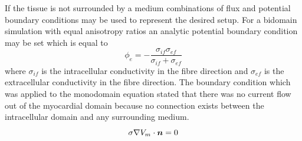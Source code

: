 If the tissue is not
surrounded by a medium combinations of flux and potential boundary conditions
may be used to represent the desired setup. For a bidomain simulation with
equal anisotropy ratios an analytic potential boundary condition \citet{henriquez:1993}
may be set which is equal to
\begin{equation}
  \phi_e=-\dfrac{\sigma_{if}\sigma_{ef}}{\sigma_{if}+\sigma_{ef}}
\end{equation}
where $\sigma_{if}$ is the intracellular conductivity in the fibre direction
and $\sigma_{ef}$ is the extracellular conductivity in the fibre direction.
The boundary condition which was applied to the monodomain equation stated
that there was no current flow out of the myocardial domain because no
connection exists between the intracellular domain and any surrounding medium.
\begin{equation}
  \dotprod{\sigma \grad V_m}{\vect{n}}=0
\end{equation}


